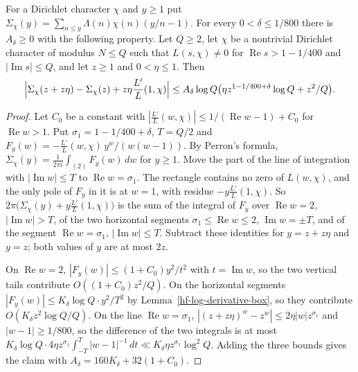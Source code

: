 \begin{lemma}\label{hf-box-tail}
For a Dirichlet character $\chi$ and $y\geq1$ put
$\Sigma_\chi(y)=\sum_{n\leq y}\Lambda(n)\chi(n)(y/n-1)$. For every $0<\delta\leq1/800$ there is
$A_\delta\geq0$ with the following property. Let $Q\geq2$, let $\chi$ be a nontrivial Dirichlet character
of modulus $N\leq Q$ such that $L(s,\chi)\neq0$ for $\operatorname{Re}s>1-1/400$ and
$|\operatorname{Im}s|\leq Q$, and let $z\geq1$ and $0<\eta\leq1$. Then
\[
 \Bigl|\Sigma_\chi(z+z\eta)-\Sigma_\chi(z)+z\eta\frac{L'}{L}(1,\chi)\Bigr|\leq
 A_\delta\log Q\bigl(\eta z^{1-1/400+\delta}\log Q+z^2/Q\bigr).
\]
\end{lemma}

\begin{proof}
Let $C_0$ be a constant with $\left|\frac{L'}{L}(w,\chi)\right|\leq1/(\operatorname{Re}w-1)+C_0$
for $\operatorname{Re}w>1$. Put $\sigma_1=1-1/400+\delta$, $T=Q/2$ and
$F_y(w)=-\frac{L'}{L}(w,\chi)\,y^w/(w(w-1))$. By
Perron's formula, $\Sigma_\chi(y)=\frac1{2\pi i}\int_{(2)}F_y(w)\,dw$ for $y\geq1$. Move the part of
the line of integration with $|\operatorname{Im}w|\leq T$ to $\operatorname{Re}w=\sigma_1$. The
rectangle contains no zero of $L(w,\chi)$, and the only pole of $F_y$ in it is at $w=1$, with residue
$-y\frac{L'}{L}(1,\chi)$. So $2\pi\bigl(\Sigma_\chi(y)+y\frac{L'}{L}(1,\chi)\bigr)$ is the sum of
the integral of $F_y$ over $\operatorname{Re}w=2$, $|\operatorname{Im}w|>T$, of the two horizontal
segments $\sigma_1\leq\operatorname{Re}w\leq2$, $\operatorname{Im}w=\pm T$, and of the segment
$\operatorname{Re}w=\sigma_1$, $|\operatorname{Im}w|\leq T$. Subtract these identities for
$y=z+z\eta$ and $y=z$; both values of $y$ are at most $2z$.

On $\operatorname{Re}w=2$, $|F_y(w)|\leq(1+C_0)y^2/t^2$ with $t=\operatorname{Im}w$, so the two
vertical tails contribute $O((1+C_0)z^2/Q)$. On the horizontal segments
$|F_y(w)|\leq K_\delta\log Q\cdot y^2/T^2$ by Lemma~\ref{hf-log-derivative-box}, so they contribute
$O(K_\delta z^2\log Q/Q)$. On the line $\operatorname{Re}w=\sigma_1$,
$|(z+z\eta)^w-z^w|\leq2\eta|w|z^{\sigma_1}$ and $|w-1|\geq1/800$, so the difference of the two
integrals is at most
$K_\delta\log Q\cdot4\eta z^{\sigma_1}\int_{-T}^T|w-1|^{-1}\,dt\ll K_\delta\eta z^{\sigma_1}\log^2Q$.
Adding the three bounds gives the claim with $A_\delta=160K_\delta+32(1+C_0)$.
\end{proof}

